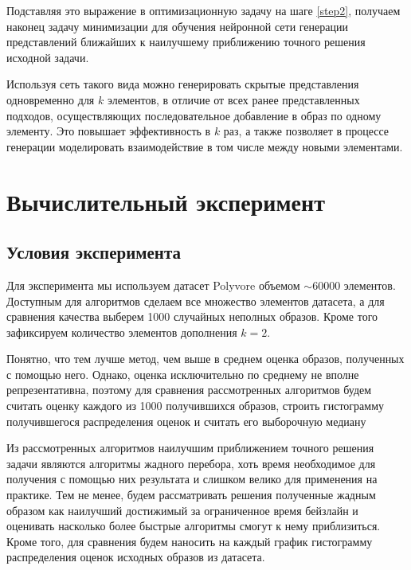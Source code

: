 \documentclass[a4paper,14pt]{extarticle}
\begin{document}
		Подставляя это выражение в оптимизационную задачу на шаге \ref{step2}, получаем наконец задачу минимизации для обучения нейронной сети генерации представлений ближайших к наилучшему приближению точного решения исходной задачи.
		
		Используя сеть такого вида можно генерировать скрытые представления одновременно для $k$ элементов, в отличие от всех ранее представленных подходов, осуществляющих последовательное добавление в образ по одному элементу. Это повышает эффективность в $k$ раз, а также позволяет в процессе генерации моделировать взаимодействие в том числе между новыми элементами.
		
		
		\section{Вычислительный эксперимент}
			\subsection{Условия эксперимента}
					Для эксперимента мы используем датасет Polyvore \cite{DBLP:journals/corr/HanWJD17} объемом  $\sim60000$ элементов. Доступным для алгоритмов сделаем все множество элементов датасета, а для сравнения качества выберем 1000 случайных неполных образов. Кроме того зафиксируем количество элементов дополнения $k=2$. 										
					
					Понятно, что тем лучше метод, чем выше в среднем оценка образов, полученных с помощью него. Однако, оценка исключительно по среднему не вполне репрезентативна, поэтому для сравнения рассмотренных алгоритмов будем считать оценку каждого из 1000 получившихся образов, строить гистограмму получившегося распределения оценок и считать его выборочную медиану
					
					Из рассмотренных алгоритмов наилучшим приближением точного решения задачи являются алгоритмы жадного перебора, хоть время необходимое для получения с помощью них результата и слишком велико для применения на практике. Тем не менее, будем рассматривать решения полученные жадным образом как наилучший достижимый за ограниченное время бейзлайн и оценивать насколько более быстрые алгоритмы смогут к нему приблизиться. Кроме того, для сравнения будем наносить на каждый график гистограмму распределения оценок исходных образов из датасета. 
					
\end{document}

